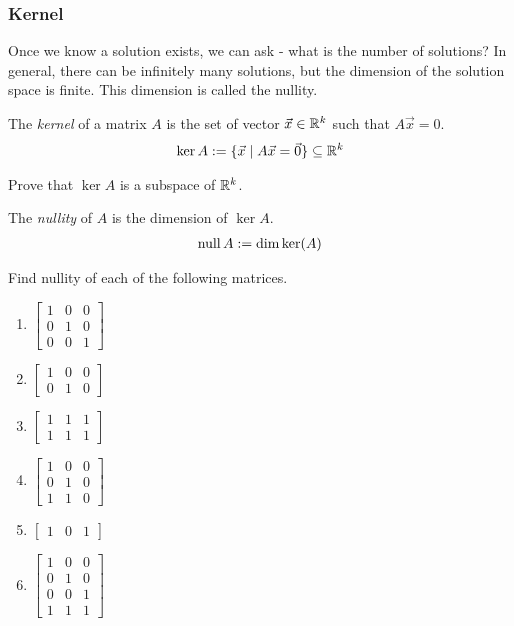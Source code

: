 \subsubsection{Kernel}
Once we know a solution exists, we can ask - what is the number of solutions? In general, there can be infinitely many solutions, but the dimension of the solution space is finite. This dimension is called the nullity.
\begin{definition}
  The \emph{kernel} of a matrix $A$ is the set of vector $\vec{x} \in \mathbb{R}^k$ such that $A \vec{x} = 0$.
  \begin{align*}
    \ker A := \{ \vec{x} \mid A \vec{x} = \vec{0} \} \subseteq \mathbb{R}^k
  \end{align*}
\end{definition}

\begin{qbox}
  Prove that $\ker A$ is a subspace of $\mathbb{R}^k$.
\end{qbox}

\begin{definition}
  The \emph{nullity} of $A$ is the dimension of $\ker A$.
  \begin{align*}
    \operatorname{null} A := \dim \ker (A)
  \end{align*}
\end{definition}

\begin{qbox}
  \label{q:nullityComputation1}
  Find nullity of each of the following matrices.
  \begin{multicols}{2}
    \begin{enumerate}
      \item $ \begin{bmatrix} 1 & 0 & 0 \\ 0 & 1 & 0 \\ 0 & 0 & 1 \end{bmatrix}$
      \item $ \begin{bmatrix} 1 & 0 & 0 \\ 0 & 1 & 0 \end{bmatrix}$
      \item $ \begin{bmatrix} 1 & 1 & 1 \\ 1 & 1 & 1 \end{bmatrix}$
      \item $ \begin{bmatrix} 1 & 0 & 0 \\ 0 & 1 & 0 \\ 1 & 1 & 0\end{bmatrix}$
      \item $\begin{bmatrix} 1 & 0 & 1 \end{bmatrix}$
      \item $ \begin{bmatrix} 1 & 0 & 0 \\ 0 & 1 & 0 \\ 0 & 0 & 1 \\ 1 & 1 & 1\end{bmatrix}$
    \end{enumerate}
  \end{multicols}
\end{qbox}

